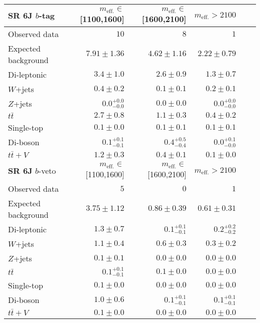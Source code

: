 \begin{tabular*}{\textwidth}{@{\extracolsep{\fill}}lrrrrr}
\toprule
\textbf{SR 6J} $b$-tag &  $m_{\mathrm{eff.}}\in$[1100,1600] & $m_{\mathrm{eff.}}\in$[1600,2100] & $m_{\mathrm{eff.}}>2100$ \\
\midrule

Observed data          & $10$              & $8$              & $1$                    \\
\midrule
Expected background         & $7.91 \pm 1.36$          & $4.62 \pm 1.16$          & $2.22 \pm 0.79$              \\
\midrule
        Di-leptonic         & $3.4 \pm 1.0$          & $2.6 \pm 0.9$          & $1.3 \pm 0.7$              \\
        $W$+jets         & $0.4 \pm 0.2$          & $0.1 \pm 0.1$          & $0.2 \pm 0.1$              \\
        $Z$+jets         & $0.0_{-0.0}^{+0.0}$          & $0.0 \pm 0.0$          & $0.0_{-0.0}^{+0.0}$              \\
        $t\bar{t}$         & $2.7 \pm 0.8$          & $1.1 \pm 0.3$          & $0.4 \pm 0.2$              \\
        Single-top         & $0.1 \pm 0.0$          & $0.1 \pm 0.1$          & $0.1 \pm 0.1$              \\
        Di-boson         & $0.1_{-0.1}^{+0.1}$          & $0.4_{-0.4}^{+0.5}$          & $0.0_{-0.0}^{+0.1}$              \\
        $t\bar{t}+V$         & $1.2 \pm 0.3$          & $0.4 \pm 0.1$          & $0.1 \pm 0.0$              \\
\toprule
\textbf{SR 6J} $b$-veto &  $m_{\mathrm{eff.}}\in$[1100,1600] & $m_{\mathrm{eff.}}\in$[1600,2100] & $m_{\mathrm{eff.}}>2100$ \\
\midrule
Observed data          & $5$              & $0$              & $1$                    \\
\midrule
Expected background         & $3.75 \pm 1.12$          & $0.86 \pm 0.39$          & $0.61 \pm 0.31$              \\
\midrule
        Di-leptonic         & $1.3 \pm 0.7$          & $0.1_{-0.1}^{+0.1}$          & $0.2_{-0.2}^{+0.2}$              \\
        $W$+jets         & $1.1 \pm 0.4$          & $0.6 \pm 0.3$          & $0.3 \pm 0.2$              \\
        $Z$+jets         & $0.1 \pm 0.1$          & $0.0 \pm 0.0$          & $0.0 \pm 0.0$              \\
        $t\bar{t}$         & $0.1_{-0.1}^{+0.1}$          & $0.1 \pm 0.0$          & $0.0 \pm 0.0$              \\
        Single-top         & $0.1 \pm 0.0$          & $0.0 \pm 0.0$          & $0.0 \pm 0.0$              \\
        Di-boson         & $1.0 \pm 0.6$          & $0.1_{-0.1}^{+0.1}$          & $0.1_{-0.1}^{+0.1}$              \\
        $t\bar{t}+V$         & $0.1 \pm 0.0$          & $0.0 \pm 0.0$          & $0.0 \pm 0.0$              \\


\bottomrule
\end{tabular*}




